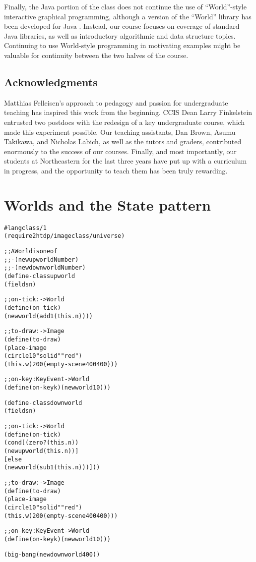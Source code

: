 \documentclass[submission,copyright]{eptcs}
\begin{document}
Finally, the Java portion of the class does not continue the use of
``World''-style interactive graphical programming, although a version
of the ``World'' library has been developed for Java
\cite{local:java-world}.  Instead, our course focuses on coverage of
standard Java libraries, as well as introductory algorithmic and data
structure topics.  Continuing to use World-style programming in
motivating examples might be valuable for continuity between the two
halves of the course.

\subsection*{Acknowledgments}

Matthias Felleisen's approach to pedagogy and passion for
undergraduate teaching has inspired this work from the beginning.
CCIS Dean Larry Finkelstein entrusted two postdocs with the redesign
of a key undergraduate course, which made this experiment possible.
Our teaching assistants, Dan Brown, Asumu Takikawa, and Nicholas
Labich, as well as the tutors and graders, contributed enormously to
the success of our courses. Finally, and most importantly, our
students at Northeastern for the last three years have put up with a
curriculum in progress, and the opportunity to teach them has been
truly rewarding.




\newpage
\appendix
\section{Worlds and the State pattern}
\label{sec:appendix}

\begin{alltt}
#lang class/1
(require 2htdp/image class/universe)

;; A World is one of 
;; - (new upworld Number)
;; - (new downworld Number)
(define-class upworld
  (fields n)

  ;; on-tick : -> World
  (define (on-tick)
    (new world (add1 (this . n))))

  ;; to-draw : -> Image
  (define (to-draw) 
    (place-image 
     (circle 10 "solid" "red")
     (this . w) 200 (empty-scene 400 400)))

  ;; on-key : KeyEvent -> World
  (define (on-key k) (new world 10)))

(define-class downworld
  (fields n)

  ;; on-tick : -> World
  (define (on-tick)
    (cond [(zero? (this . n))
           (new upworld (this . n))]
          [else
           (new world (sub1 (this . n)))]))

  ;; to-draw : -> Image
  (define (to-draw) 
    (place-image 
     (circle 10 "solid" "red")
     (this . w) 200 (empty-scene 400 400)))

  ;; on-key : KeyEvent -> World
  (define (on-key k) (new world 10)))
  
(big-bang (new downworld 400))
\end{alltt}
\end{document}

